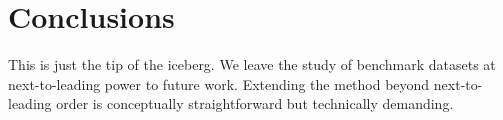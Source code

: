 \section{Conclusions}\label{sec:conclusions}

This is just the tip of the iceberg. We leave the study of benchmark
datasets at next-to-leading power to future work. Extending the method
beyond next-to-leading order is conceptually straightforward but
technically demanding.

